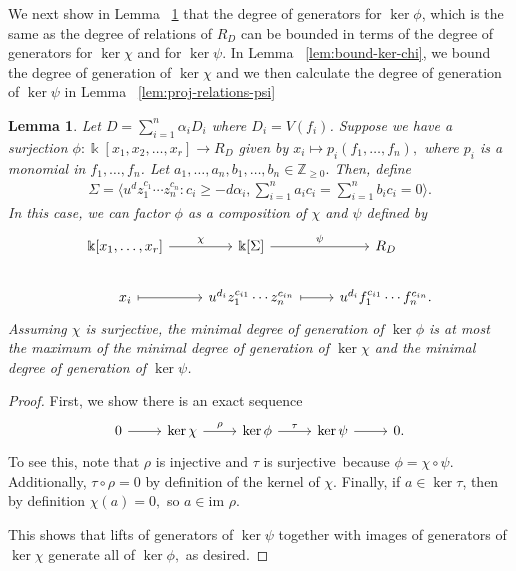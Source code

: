 \documentclass{amsart}
\theoremstyle{plain}
\newtheorem{lem}[thm]{Lemma}
\theoremstyle{definition}
\theoremstyle{remark}
\numberwithin{equation}{section}
\newcommand\bz{{\mathbb Z}}
\newcommand\bk{{\Bbbk}}
\newcommand\im{\text{im }}
\newcommand\bida{a}
\newcommand\bidb{b}
\begin{document}
We next show in Lemma ~\ref{lem:composite-map} that the degree of 
generators for $\ker \phi$, which is the same as the degree of relations
of $R_D$ can be bounded in terms of the degree of generators for
$\ker \chi$ and for $\ker \psi$.
In Lemma ~\ref{lem:bound-ker-chi}, we bound the degree of generation of
$\ker \chi $ and we then calculate the degree of generation of $\ker \psi$ in Lemma ~\ref{lem:proj-relations-psi}

\begin{lem}
\label{lem:composite-map}
Let $D = \sum_{i=1}^{n}\alpha_i D_i$ where $D_i = V(f_i)$. Suppose we have a
surjection $\phi: \bk[x_1,x_2,\ldots, x_r] \rightarrow R_D$ given by $x_i
\mapsto p_i(f_1, \ldots, f_n),$ where $p_i$ is a monomial in $f_1,\ldots, f_n$.
Let $\bida_1, \ldots, \bida_n, \bidb_1, \ldots, \bidb_n \in \bz_{\geq 0}.$
Then, define
\begin{align*}
	\Sigma = \langle u^d z_1^{c_1} \cdots z_n^{c_n} : c_i \geq -d \alpha_i, \sum_{i=1}^{n} \bida_i c_i = \sum_{i=1}^{n} \bidb_i c_i = 0 \rangle. 
\end{align*}
In this case, we can factor $\phi$ as a composition of $\chi$ and $\psi$ defined by
\[
\begin{tikzcd}
\bk[x_1,\ldots, x_r] \ar {r}{\chi} & \bk[\Sigma] \ar {r}{\psi} & R_D \\
x_i \arrow[mapsto]{r} & u^{d_i}z_1^{c_{i1}} \cdots z_n^{c_{in}} \arrow[mapsto]{r} & u^{d_i}f_1^{c_{i1}} \cdots f_n^{c_{in}}.
\end{tikzcd}
\]
Assuming $\chi$ is surjective, the minimal degree of generation of $\ker \phi$
is at most the maximum of the minimal degree of generation of $\ker \chi$ and
the minimal degree of generation of $\ker \psi$.
\end{lem}
\begin{proof}
First, we show there is an exact sequence
\[
\begin{tikzcd}
0 \ar {r} & \ker \chi \ar{r}{\rho} & \ker \phi \ar {r}{\tau} & \ker \psi \ar r & 0.
\end{tikzcd}
\]
To see this, note that $\rho$ is injective and $\tau$ is surjective\ because
$\phi = \chi \circ \psi$. Additionally, $\tau \circ \rho = 0$ by definition of
the kernel of $\chi$. Finally, if $a \in\ker \tau$, then by definition $\chi(a)
= 0,$ so $a \in \im \rho$.

This shows that lifts of generators of $\ker \psi$ together with images of
generators of $\ker \chi$ generate all of $\ker \phi,$ as desired. 
\end{proof}
\end{document}

